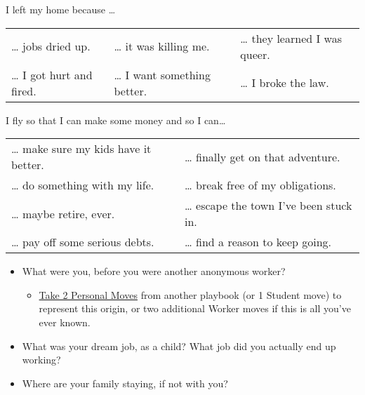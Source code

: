 \documentclass[twoside,headings,a4paper]{article}
\begin{document}
{    I left my home because \dots{}\\
    \begin{NiceTabular}{XXX}
        \textbullet{} \dots{} jobs dried up.           &
        \textbullet{} \dots{} it was killing me.       &
        \textbullet{} \dots{} they learned I was queer.  \\
        \textbullet{} \dots{} I got hurt and fired.    &
        \textbullet{} \dots{} I want something better. &
        \textbullet{} \dots{} I broke the law.
    \end{NiceTabular}

    I fly so that I can make some money and so I can\dots{}\\
    \begin{NiceTabular}{XX}
        \textbullet{} \dots{} make sure my kids have it better. &
        \textbullet{} \dots{} finally get on that adventure.      \\
        \textbullet{} \dots{} do something with my life.        &
        \textbullet{} \dots{} break free of my obligations.       \\
        \textbullet{} \dots{} maybe retire, ever.               &
        \textbullet{} \dots{} escape the town I’ve been stuck in. \\
        \textbullet{} \dots{} pay off some serious debts.       &
        \textbullet{} \dots{} find a reason to keep going.
    \end{NiceTabular}

    \vfill
    \columnbreak
    \begin{itemize}
        \item What were you, before you were another anonymous worker?
              \begin{itemize}
                  \item \underline{Take 2 Personal Moves} from another playbook (or 1 Student move) to represent this
                        origin, or two additional Worker moves if this is all you’ve ever known.
              \end{itemize}
        \item What was your dream job, as a child? What job did you actually end up working?
        \item Where are your family staying, if not with you?
    \end{itemize}


}
\end{document}
